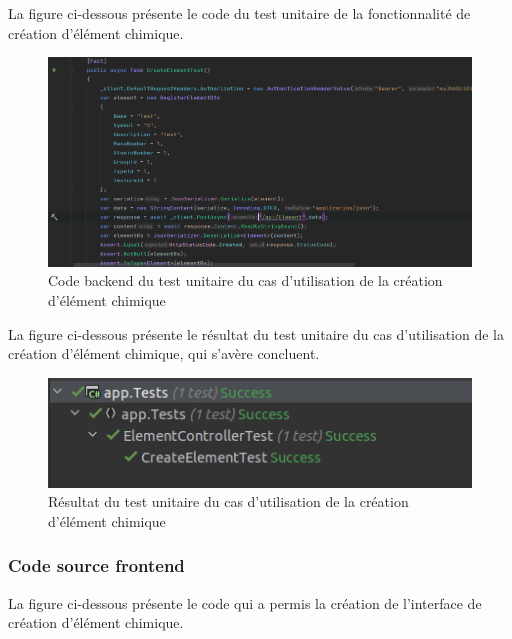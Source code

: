 La figure ci-dessous présente le code du test unitaire de la fonctionnalité de création d'élément chimique.

\begin{figure}[H]
	\centering
	\includegraphics[width=1\textwidth]{img/cet}
	\caption{Code backend du test unitaire du cas d'utilisation de la création d'élément chimique}
	\label{fig:mesh1}
\end{figure}

La figure ci-dessous présente le résultat du test unitaire du cas d'utilisation de la création d'élément chimique, qui s'avère concluent.

\begin{figure}[H]
	\centering
	\includegraphics[width=1\textwidth]{img/ute}
	\caption{Résultat du test unitaire du cas d'utilisation de la création d'élément chimique}
	\label{fig:mesh1}
\end{figure}

\subsubsection{Code source frontend}

La figure ci-dessous présente le code qui a permis la création de l'interface de création d'élément chimique.


